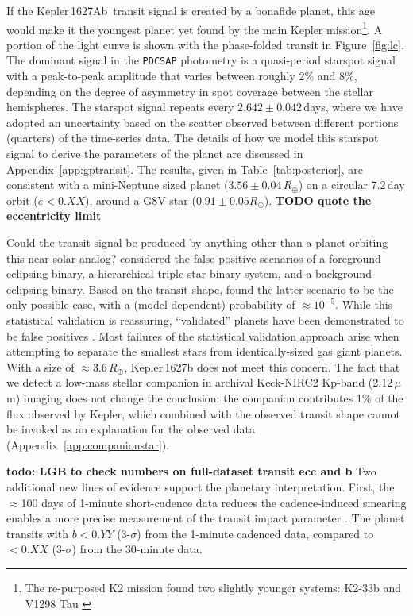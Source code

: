 \documentclass[12pt,modern,tighten]{aastex63}
\newcommand{\pn}{Kepler\,1627Ab} %
\begin{document}
If the \pn\ transit signal is created by a bonafide planet, this age
would make it the youngest planet yet found by the main Kepler
mission\footnote{The re-purposed K2 mission found two slightly younger
systems: K2-33b \citep{David_et_al_2017,Mann_K2_33b_2016} and V1298
Tau \citep{david_four_2019}}.  A portion of the light curve is shown
with the phase-folded transit
in Figure~\ref{fig:lc}.  The dominant signal in the
\texttt{PDCSAP} photometry is a quasi-period starspot signal with a
peak-to-peak amplitude that varies between roughly 2\% and 8\%,
depending on the degree of asymmetry in spot coverage between the
stellar hemispheres.  The starspot signal repeats every
$2.642\pm0.042$\,days, where we have adopted an uncertainty based on
the scatter observed between different portions (quarters) of the
time-series data.  The details of how we model this starspot signal to
derive the parameters of the planet are discussed in
Appendix~\ref{app:gptransit}.  The results, given in
Table~\ref{tab:posterior}, are consistent with a mini-Neptune sized
planet ($3.56\pm 0.04\,R_\oplus$) on a circular 7.2\,day orbit
($e<0.XX$), around a G8V star ($0.91 \pm 0.05 R_\odot$).  {\bf TODO
quote the eccentricity limit}

Could the transit signal be produced by anything other than a planet
orbiting this near-solar analog?  \citet{morton_false_2016} considered
the false positive scenarios of a foreground eclipsing binary, a
hierarchical triple-star binary system, and a background eclipsing
binary.  Based on the transit shape, \citet{morton_false_2016} found
the latter scenario to be the only possible case, with a
(model-dependent) probability of $\approx10^{-5}$.  While this
statistical validation is reassuring, ``validated'' planets have been
demonstrated to be false positives \citep{shporer_three_2017}.  Most
failures of the statistical validation approach arise when attempting
to separate the smallest stars from identically-sized gas giant
planets.  With a size of $\approx 3.6\,R_\oplus$, Kepler\,1627b does
not meet this concern.  The fact that we detect a low-mass stellar
companion in archival Keck-NIRC2 Kp-band (2.12\,$\mu $m) imaging does
not change the conclusion: the companion contributes 1\% of the flux
observed by Kepler, which combined with the observed transit shape
cannot be invoked as an explanation for the observed data
(Appendix~\ref{app:companionstar}).

{\bf todo: LGB to check numbers on full-dataset transit ecc and b} 
Two additional new lines of evidence support the planetary
interpretation.  First, the $\approx$100 days of 1-minute
short-cadence data reduces the cadence-induced smearing enables a more
precise measurement of the transit impact parameter
\citep{kipping_binning_2010}.  The planet transits with $b<0.YY$
(3-$\sigma$) from the 1-minute cadenced data, compared to $<0.XX$
(3-$\sigma$) from the 30-minute data.
\end{document}
